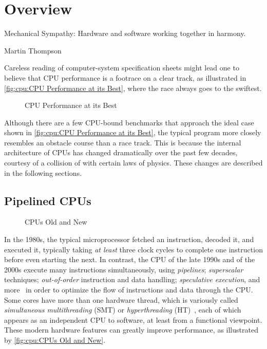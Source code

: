 
\section{Overview}
\label{sec:cpu:Overview}
%
\epigraph{Mechanical Sympathy:
	  Hardware and software working together in harmony.}
	 {Martin Thompson}

Careless reading of computer-system specification sheets might lead one
to believe that CPU performance is a footrace on a clear track, as
illustrated in \cref{fig:cpu:CPU Performance at its Best},
where the race always goes to the swiftest.

\begin{figure}
\centering
{}
\caption{CPU Performance at its Best}
\end{figure}

Although there are a few CPU-bound benchmarks that approach the ideal case
shown in \cref{fig:cpu:CPU Performance at its Best},
the typical program more closely resembles an obstacle course than
a race track.
This is because the internal architecture of CPUs has changed dramatically
over the past few decades, courtesy of a collision of 
with certain laws of physics.
These changes are described in the following sections.

\subsection{Pipelined CPUs}
\label{sec:cpu:Pipelined CPUs}

\begin{figure}
\centering
{}
\caption{CPUs Old and New}
\end{figure}

In the 1980s, the typical microprocessor fetched an instruction, decoded
it, and executed it, typically taking \emph{at least} three clock cycles
to complete one instruction before even starting the next.
In contrast, the CPU of the late 1990s and of the 2000s execute many
instructions simultaneously, using \emph{pipelines}; \emph{superscalar}
techniques; \emph{out-of-order} instruction and data handling;
\emph{speculative execution}, and
more~\cite{Hennessy2017}
in order to optimize the flow of instructions and data through the CPU\@.
Some cores have more than one hardware thread, which is variously called
\emph{simultaneous multithreading} (SMT) or \emph{hyperthreading}
(HT)~\cite{JFennel1973SMT},
each of which appears as
an independent CPU to software, at least from a functional viewpoint.
These modern hardware features can greatly improve performance, as
illustrated by \cref{fig:cpu:CPUs Old and New}.

